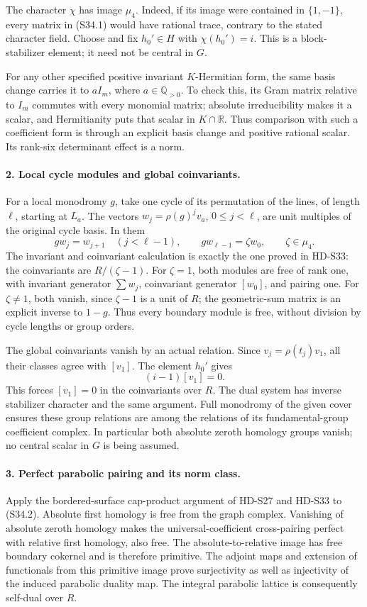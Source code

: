 The character \(\chi\) has image \(\mu_4\). Indeed, if its
image were contained in \(\{1,-1\}\), every matrix in (S34.1)
would have rational trace, contrary to the stated character field.
Choose and fix \(h_0'\in H\) with \(\chi(h_0')=i\).
This is a block-stabilizer element; it need not be central in
\(G\).

For any other specified positive invariant \(K\)-Hermitian form,
the same basis change carries it to \(aI_m\), where
\(a\in\mathbb Q_{>0}\). To check this, its Gram matrix relative
to \(I_m\) commutes with every monomial matrix; absolute
irreducibility makes it a scalar, and Hermitianity puts that scalar
in \(K\cap\mathbb R\). Thus comparison with such a coefficient
form is through an explicit basis change and positive rational
scalar. Its rank-six determinant effect is a norm.

\paragraph{2. Local cycle modules and global coinvariants.}
For a local monodromy \(g\), take one cycle of its permutation
of the lines, of length \(\ell\), starting at \(L_a\). The
vectors \(w_j=\rho(g)^jv_a\), \(0\le j<\ell\), are unit
multiples of the original cycle basis. In them
\[
 g w_j=w_{j+1}\quad(j<\ell-1),\qquad
 g w_{\ell-1}=\zeta w_0,\qquad \zeta\in\mu_4.
\]
The invariant and coinvariant calculation is exactly the one
proved in HD-S33: the coinvariants are \(R/(\zeta-1)\).
For \(\zeta=1\), both modules are free of rank one, with
invariant generator \(\sum w_j\), coinvariant generator
\([w_0]\), and pairing one. For \(\zeta\ne1\), both vanish,
since \(\zeta-1\) is a unit of \(R\); the geometric-sum
matrix is an explicit inverse to \(1-g\). Thus every boundary
module is free, without division by cycle lengths or group orders.

The global coinvariants vanish by an actual relation. Since
\(v_j=\rho(t_j)v_1\), all their classes agree with \([v_1]\).
The element \(h_0'\) gives
\[
                       (i-1)[v_1]=0.
\]
This forces \([v_1]=0\) in the coinvariants over \(R\).
The dual system has inverse stabilizer character and the same
argument. Full monodromy of the given cover ensures these group
relations are among the relations of its fundamental-group
coefficient complex. In particular both absolute zeroth homology
groups vanish; no central scalar in \(G\) is being assumed.

\paragraph{3. Perfect parabolic pairing and its norm class.}
Apply the bordered-surface cap-product argument of HD-S27 and
HD-S33 to (S34.2). Absolute first homology is free from the graph
complex. Vanishing of absolute zeroth homology makes the
universal-coefficient cross-pairing perfect with relative first
homology, also free. The absolute-to-relative image has free
boundary cokernel and is therefore primitive. The adjoint maps
and extension of functionals from this primitive image prove
surjectivity as well as injectivity of the induced parabolic
duality map. The integral parabolic lattice is consequently
self-dual over \(R\).

